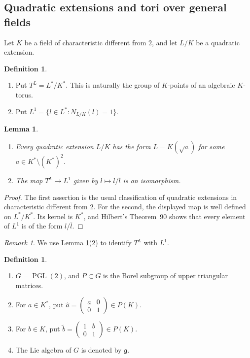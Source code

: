 \documentclass[11pt,a4paper,twoside]{amsart}
\newtheorem{lemma}[theorem]{Lemma}
\theoremstyle{definition}
\newtheorem{definition}[theorem]{Definition}
\theoremstyle{remark}
\newtheorem{remark}[theorem]{Remark}
\newcommand{\fg}{\mathfrak g}
\newcommand{\sm}{\setminus}
\newcommand{\PGL}{\operatorname{PGL}}
\begin{document}
\subsection{Quadratic extensions and tori over general fields}
Let $K$ be a field of characteristic different from $2$, and let $L/K$ be a quadratic extension.
\begin{definition}
\begin{enumerate}
\item Put $T^L=L^*/K^*$. This is naturally the group of $K$-points of an algebraic $K$-torus.
\item Put $L^1=\{l\in L^*:N_{L/K}(l)=1\}$.
\end{enumerate}
\end{definition}
\begin{lemma}\label{j}
\begin{enumerate}
\item Every quadratic extension $L/K$ has the form $L=K(\sqrt a)$ for some $a\in K^*\sm(K^*)^2$.
\item The map $T^L\to L^1$ given by $l\mapsto l/\bar l$ is an isomorphism.
\end{enumerate}
\end{lemma}
\begin{proof}
The first assertion is the usual classification of quadratic extensions in characteristic different from $2$. For the second, the displayed map is well defined on $L^*/K^*$. Its kernel is $K^*$, and Hilbert's Theorem~90 shows that every element of $L^1$ is of the form $l/\bar l$.
\end{proof}
\begin{remark}\label{jj}
We use Lemma \ref{j}(2) to identify $T^L$ with $L^1$.
\end{remark}
\begin{definition}\label{G-K-def}
\begin{enumerate}
\item $G=\PGL(2)$, and $P\subset G$ is the Borel subgroup of upper triangular matrices.
\item For $a\in K^*$, put $\widehat a=\begin{pmatrix}a&0\\0&1\end{pmatrix}\in P(K)$.
\item For $b\in K$, put $\widetilde b=\begin{pmatrix}1&b\\0&1\end{pmatrix}\in P(K)$.
\item The Lie algebra of $G$ is denoted by $\fg$.
\end{enumerate}
\end{definition}
\end{document}
